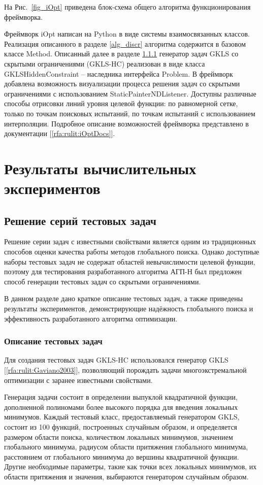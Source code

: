 \documentclass[a4paper,12pt,russian]{article}
\begin{document}
На Рис.~\ref{fig_iOpt} приведена блок-схема общего алгоритма функционирования фреймворка.

Фреймворк iOpt написан на Python в виде системы взаимосвязанных классов. Реализация описанного в разделе \ref{alg_discr} алгоритма содержится в базовом классе Method. Описанный далее в разделе \ref{GKLS_HC} генератор задач GKLS со скрытыми ограничениями (GKLS-HC) реализован в виде класса GKLSHiddenConstraint -- наследника интерфейса Problem. В фреймворк добавлена возможность визуализации процесса решения задач со скрытыми ограничениями с использованием StaticPainterNDListener. Доступны различные способы отрисовки линий уровня целевой функции: по равномерной сетке, только по точкам поисковых испытаний, по точкам испытаний с использованием интерполяции. Подробное описание возможностей фреймворка представлено в документации [\ref{rfa:rulit:iOptDocs}].

\section{Результаты вычислительных экспериментов}

\subsection{Решение серий тестовых задач} \label{GKLS_HC}

Решение серии задач с известными свойствами является одним из традиционных способов оценки качества работы методов глобального поиска. 
Однако доступные наборы тестовых задач не содержат областей невычислимости целевой функции, поэтому для тестирования разработанного алгоритма АГП-Н был предложен способ генерации тестовых задач со скрытыми ограничениями.

В данном разделе дано краткое описание тестовых задач, а также приведены результаты экспериментов, демонстрирующие надёжность глобального поиска и эффективность разработанного алгоритма оптимизации.

\subsubsection{Описание тестовых задач} \label{GKLS_HC}
 
Для создания тестовых задач GKLS-HC использовался генератор GKLS [\ref{rfa:rulit:Gaviano2003}], позволяющий порождать задачи многоэкстремальной оптимизации с заранее известными свойствами. 

Генерация задачи состоит в определении выпуклой квадратичной функции, дополненной полиномами более высокого порядка для введения локальных минимумов. Каждый тестовый класс, предоставляемый генератором GKLS, состоит из 100 функций, построенных случайным образом, и определяется размером области поиска, количеством локальных минимумов, значением глобального минимума, радиусом области притяжения глобального минимума, расстоянием от глобального минимума до вершины квадратичной функции. Другие необходимые параметры, такие как точки всех локальных минимумов, их области притяжения и значения, выбираются генератором случайным образом.
\end{document}
